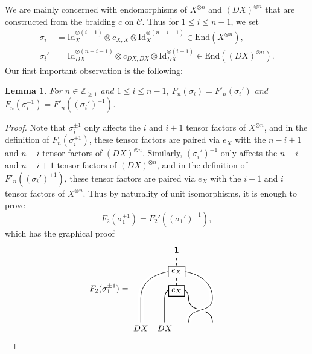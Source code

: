 \documentclass[11pt, reqno]{amsart}
\newtheorem{lem}[thm]{Lemma}
\theoremstyle{definition}\newtheorem{defi}[thm]{Definition}
\theoremstyle{definition}\newtheorem{rem}[thm]{Remark}
\theoremstyle{definition}\newtheorem{exam}[thm]{Example}
\theoremstyle{definition}\newtheorem{assum}[thm]{Assumption}
\newcommand{\cC}{\mathcal{C}}
\newcommand{\ZZ}{\mathbb{Z}}
\newcommand{\Id}{\mathrm{Id}}
\newcommand{\vac}{\mathbf{1}}
\begin{document}
We are mainly concerned with endomorphisms of $X^{\otimes n}$ and $(DX)^{\otimes n}$ that are constructed from the braiding $c$ on $\cC$. Thus for $1\leq i\leq n-1$, we set
\begin{align*}
\sigma_i &=\Id_X^{\otimes (i-1)}\otimes c_{X,X}\otimes\Id_X^{\otimes (n-i-1)}\in\mathrm{End}(X^{\otimes n}),\\\sigma_i' & =\Id_{DX}^{\otimes (n-i-1)}\otimes c_{DX,DX}\otimes\Id_{DX}^{\otimes (i-1)}\in\mathrm{End}((DX)^{\otimes n}).
\end{align*}
Our first important observation is the following:
\begin{lem}\label{lem:sigma-sigma'}
For $n\in\ZZ_{\geq 1}$ and $1\leq i\leq n-1$, $F_n(\sigma_i) =F'_n(\sigma_{i}')$ and $F_n(\sigma_i^{-1}) =F'_n((\sigma_{i}')^{-1})$.
\end{lem}
\begin{proof}
Note that $\sigma_i^{\pm 1}$ only affects the $i$ and $i+1$ tensor factors of $X^{\otimes n}$, and in the definition of $F_n(\sigma_i^{\pm 1})$, these tensor factors are paired via $e_X$ with the $n-i+1$ and $n-i$ tensor factors of $(DX)^{\otimes n}$. Similarly, $(\sigma_{i}')^{\pm 1}$ only affects the $n-i$ and $n-i+1$ tensor factors of $(DX)^{\otimes n}$, and in the definition of $F'_n((\sigma_{i}')^{\pm 1})$, these tensor factors are paired via $e_X$ with the $i+1$ and $i$ tensor factors of $X^{\otimes n}$. Thus by naturality of unit isomorphisms, it is enough to prove
\begin{equation*}
F_{2}(\sigma_1^{\pm 1}) = F_{2}'((\sigma_1')^{\pm 1}),
\end{equation*}
which has the graphical proof
\begin{align*}
F_{2}(\sigma_1^{\pm 1}) & =  \begin{matrix}
    \begin{tikzpicture}[scale = 1, baseline = {(current bounding box.center)}, line width=0.75pt]
        \draw (1,0) -- (1,1) .. controls (1,1.6) and (2,1.6) .. (2,1) .. controls (2,.3) and (3,.7) .. (3,0);
        \draw[white, double=black, line width = 3pt ] (0,0) -- (0,1) .. controls (0,2.5) and (3,2.5) .. (3,1) .. controls (3,.3) and (2,.7) .. (2,0);
        \draw[dashed] (1.5,1.3) -- (1.5,2.75);
              \node at (1.5,1.3) [draw,minimum width=10pt,minimum height=10pt,thick, fill=white] {$e_X$};
      \node at (1.5,2.1) [draw,minimum width=20pt,minimum height=10pt,thick, fill=white] {$e_X$};
      \node at (1.5,3) {$\vac$};
      \node at (1.5,3) {$\vac$};
      \node at (0,-.25) {$DX$};
      \node at (1,-.25) {$DX$};

\end{tikzpicture}
\end{matrix}
\end{align*}
\end{proof}
\end{document}
